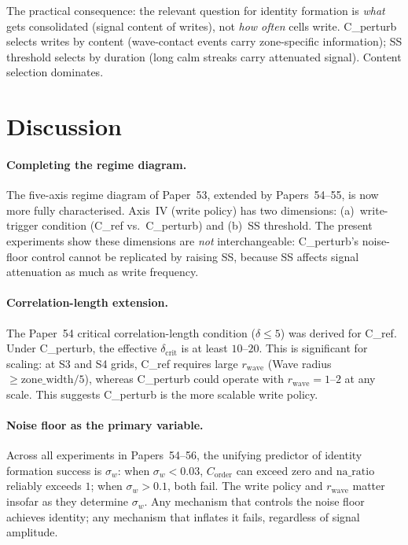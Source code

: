 \documentclass[11pt,a4paper]{article}
\newcommand{\Corder}{C_{\mathrm{order}}}
\newcommand{\sw}{\sigma_w}
\newcommand{\na}{\mathrm{na\_ratio}}
\begin{document}
The practical consequence: the relevant question for identity formation is
\emph{what} gets consolidated (signal content of writes), not \emph{how often}
cells write. C\_perturb selects writes by content (wave-contact events carry
zone-specific information); SS threshold selects by duration (long calm streaks
carry attenuated signal). Content selection dominates.

\section{Discussion}

\paragraph{Completing the regime diagram.}
The five-axis regime diagram of Paper~53, extended by Papers~54--55, is now
more fully characterised. Axis~IV (write policy) has two dimensions:
(a)~write-trigger condition (C\_ref vs.\ C\_perturb) and (b)~SS threshold.
The present experiments show these dimensions are \emph{not} interchangeable:
C\_perturb's noise-floor control cannot be replicated by raising SS,
because SS affects signal attenuation as much as write frequency.

\paragraph{Correlation-length extension.}
The Paper~54 critical correlation-length condition ($\delta \leq 5$) was derived
for C\_ref. Under C\_perturb, the effective $\delta_\mathrm{crit}$ is at least
$10$--$20$. This is significant for scaling: at S3 and S4 grids, C\_ref requires
large $r_\mathrm{wave}$ (Wave radius $\geq \text{zone\_width}/5$), whereas
C\_perturb could operate with $r_\mathrm{wave}=1$--$2$ at any scale.
This suggests C\_perturb is the more scalable write policy.

\paragraph{Noise floor as the primary variable.}
Across all experiments in Papers~54--56, the unifying predictor of identity
formation success is $\sw$: when $\sw < 0.03$, $\Corder$ can exceed zero and
$\na$ reliably exceeds $1$; when $\sw > 0.1$, both fail.
The write policy and $r_\mathrm{wave}$ matter insofar as they determine $\sw$.
Any mechanism that controls the noise floor achieves identity; any mechanism
that inflates it fails, regardless of signal amplitude.
\end{document}
